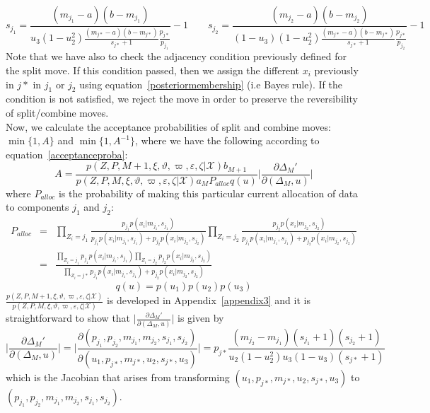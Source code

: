 \documentclass[journal,10pt]{elsart}
\begin{document}
\begin{equation}\label{split4}
s_{j_1}=\frac{(m_{j_1}-a)(b-m_{j_1})}{u_3(1-u_2^2)\frac{(m_{j*}-a)(b-m_{j*})}{s_{j*}+1}\frac{p_{j*}}{p_{j_1}}}-1 \qquad s_{j_2}=\frac{(m_{j_2}-a)(b-m_{j_2})}{(1-u_3)(1-u_2^2)\frac{(m_{j*}-a)(b-m_{j*})}{s_{j*}+1}\frac{p_{j*}}{p_{j_2}}}-1
\end{equation}
Note that we have also to check the adjacency condition previously defined for the split move. If this condition passed, then we assign the different $x_i$ previously in $j*$ in $j_1$ or $j_2$ using equation~\ref{posteriormembership} (i.e Bayes rule). If the condition is not satisfied, we reject the move in order to preserve the reversibility of split/combine moves.\\
Now, we calculate the acceptance probabilities of split and combine moves: $\min\{1, A\}$ and $\min\{1,A^{-1}\}$, where we have the following according to equation~\ref{acceptanceproba}:
\begin{equation}
A=\frac{p(Z,P,M+1,\xi,\vartheta,\varpi,\varepsilon,\zeta|\mathcal{X})b_{M+1}}{p(Z,P,M,\xi,\vartheta,\varpi,\varepsilon,\zeta|\mathcal{X})a_{M}P_{alloc}q(u)}\bigg|\frac{\partial\Delta_M'}{\partial(\Delta_M,u)}\bigg|
\end{equation}
where $P_{alloc}$ is the probability of making this particular current allocation of data to components $j_1$ and $j_2$:
\begin{eqnarray}
\nonumber P_{alloc}&=&\prod_{Z_i=j_1}\frac{p_{j_{1}}p(x_i|m_{j_1},s_{j_1})}{p_{j_{1}}p(x_i|m_{j_1},s_{j_1})+p_{j_{2}}p(x_i|m_{j_2},s_{j_2})}\prod_{Z_i=j_2}\frac{p_{j_{2}}p(x_i|m_{j_2},s_{j_2})}{p_{j_{1}}p(x_i|m_{j_1},s_{j_1})+p_{j_{2}}p(x_i|m_{j_2},s_{j_2})}\\
&=&\frac{\prod_{Z_i=j_1}p_{j_{1}}p(x_i|m_{j_1},s_{j_1})\prod_{Z_i=j_2}p_{j_{2}}p(x_i|m_{j_2},s_{j_2})}{\prod_{Z_i=j*}p_{j_{1}}p(x_i|m_{j_1},s_{j_1})+p_{j_{2}}p(x_i|m_{j_2},s_{j_2})}
\end{eqnarray}
\begin{equation}
q(u)=p(u_1)p(u_2)p(u_3)
\end{equation}
$\frac{p(Z,P,M+1,\xi,\vartheta,\varpi,\varepsilon,\zeta|\mathcal{X})}{p(Z,P,M,\xi,\vartheta,\varpi,\varepsilon,\zeta|\mathcal{X})}$
is developed in Appendix~\ref{appendix3} and it is straightforward to show that
$\bigg|\frac{\partial\Delta_M'}{\partial(\Delta_M,u)}\bigg|$ is given by
\begin{equation}
\bigg|\frac{\partial\Delta_M'}{\partial(\Delta_M,u)}\bigg|=\bigg|\frac{\partial (p_{j_1},p_{j_2},m_{j_1},m_{j_2},s_{j_1},s_{j_2})}{\partial (u_1,p_{j*},m_{j*},u_2,s_{j*},u_3)}\bigg|=p_{j*}\frac{(m_{j_2}-m_{j_1})(s_{j_1}+1)(s_{j_2}+1)}{u_2(1-u_2^2)u_3(1-u_3)(s_{j*}+1)}
\end{equation}
which is the Jacobian that arises from transforming $(u_1,p_{j*},m_{j*},u_2,s_{j*},u_3)$ to $(p_{j_1},p_{j_2},m_{j_1},m_{j_2},s_{j_1},s_{j_2})$.
\end{document}
